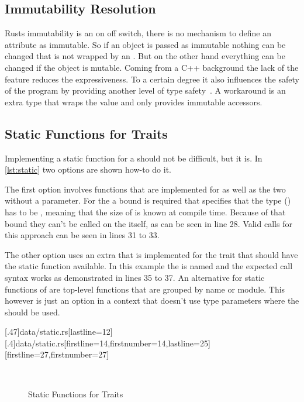 \documentclass[thesis]{subfiles}
\begin{document}

  \subsection{Immutability Resolution}
    Rusts immutability is an on off switch, there is no mechanism to define an attribute as immutable.
    So if an object is passed as immutable nothing can be changed that is not wrapped by an \UnsafeCellT.
    But on the other hand everything can be changed if the object is mutable.
    Coming from a C++ background the lack of the  feature reduces the expressiveness.
    To a certain degree it also influences the safety of the program by providing another level of type safety~\autocite[30ff.]{cpp101}.
    A workaround is an extra type that wraps the value and only provides immutable accessors.

  \subsection{Static Functions for Traits}
    Implementing a static function for a \trait should not be difficult, but it is.
    In \autoref{lst:static} two options are shown how-to do it.

    The first option involves functions that are implemented for \Foo as well as the two \traits without a \self parameter.
    For the \traits a bound is required that specifies that the \self type (\Self) has to be \Sized, meaning that the size of \Self is known at compile time.
    Because of that bound they can't be called on the \trait itself, as can be seen in line 28.
    Valid calls for this approach can be seen in lines 31 to 33.

    The other option uses an extra \trait that is implemented for the trait that should have the static function available.
    In this example the \trait is named  and the expected call syntax works as demonstrated in lines 35 to 37.
    An alternative for static functions of \traits are top-level functions that are grouped by name or module.
    This however is just an option in a context that doesn't use type parameters where the \trait should be used.

    \LstTikzBox{\staticOne}[.47\linewidth]{data/static.rs}[lastline=12]
    \LstTikzBox{\staticTwo}[.4\linewidth]{data/static.rs}[firstline=14,firstnumber=14,lastline=25]
    [firstline=27,firstnumber=27]
    \begin{figure}[ht]
      \captionsetup{type=lstlisting}
      \centering
      \usebox{\staticOne}\hfill%
      \usebox{\staticTwo}\\\vspace*{.75em}%
      \usebox{\staticThree}
      \caption{Static Functions for Traits}\label{lst:static}
    \end{figure}
\end{document}

